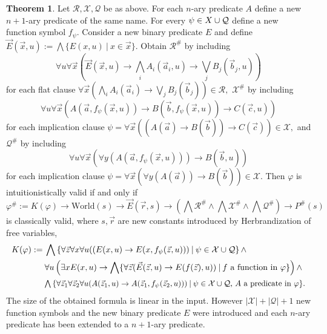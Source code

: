\documentclass{easychair}
\theoremstyle{definition}
\newtheorem{theorem}{Theorem}[section]
\theoremstyle{definition}
\theoremstyle{definition}
\theoremstyle{definition}
\theoremstyle{definition}
\theoremstyle{definition}
\theoremstyle{definition}
\begin{document}
\begin{theorem}\label{thm:fo-translation}
	Let $\mathcal R,\mathcal X,\mathcal Q$ be as above. For each $n$-ary predicate $A$ define a new $n+1$-ary predicate of the same name. For every $\psi\in\mathcal \mathcal X\cup\mathcal Q$ define a new function symbol $f_\psi$. Consider a new binary predicate $E$ and define $\vec E(\vec x, u) := \bigwedge\{E(x, u)\:|\:x\in\vec x\}$. Obtain $\mathcal R^\#$ by including
	$$
		\forall u\forall \vec x\left(\vec E(\vec x, u)\to\bigwedge_i A_i(\vec a_i, u)\to\bigvee_j B_j(\vec b_j, u)\right)
	$$
 	for each flat clause
 	$
 		\forall \vec x\left(\bigwedge_i A_i(\vec a_i)\to\bigvee_j B_j(\vec b_j)\right)\in\mathcal R,
 	$
 	$\mathcal X^\#$ by including
 	$$
 		\forall u\forall \vec x\left(A(\vec a, f_\psi(\vec x, u))\to B(\vec b, f_\psi(\vec x, u))\to C(\vec c, u)\right)
 	$$
 	for each implication clause
	$
		\psi = \forall \vec x\left(\left(A(\vec a)\to B(\vec b)\right)\to C(\vec c)\right)\in\mathcal X,
	$
	and $\mathcal Q^\#$ by including
	$$
		\forall u\forall \vec x\left(\forall y\left(A(\vec a, f_\psi(\vec x, u))\right)\to B(\vec b, u)\right)
	$$
	for each implication clause
	$
		\psi = \forall \vec x\left(\forall y\left(A(\vec a)\right)\to B(\vec b)\right)\in\mathcal X.
	$
	Then $\varphi$ is intuitionistically valid if and only if
	$$
		\varphi^\# := K(\varphi)\to\text{World}(s)\to\vec E(\vec r, s) \to \left(\bigwedge\mathcal R^\#\wedge\bigwedge\mathcal X^\#\wedge\bigwedge\mathcal Q^\#\right)\to P^\#(s)
	$$
	is classically valid, where $s, \vec r$ are new constants introduced by Herbrandization of free variables,
	\begin{align*}
		K(\varphi) := &\:\bigwedge\left\{\forall\vec z\forall x\forall u((E(x, u)\to E(x, f_\psi(\vec z, u)))\:|\:\psi\in\mathcal X\cup\mathcal Q\right\}\wedge\\
		&\:\forall u\left(\exists xE(x, u)\to \bigwedge\{\forall\vec z(\vec E(\vec z, u)\to E(f(\vec z), u))\:|\:\text{$f$ a function in $\varphi$}\}\right)\wedge\\
		&\resizebox{.9\hsize}{!}{$\:\bigwedge\left\{\forall\vec z_1\forall \vec z_2\forall u(A(\vec z_1, u)\to A(\vec z_1, f_\psi(\vec z_2, u)))\:|\:\text{$\psi\in\mathcal X\cup\mathcal Q$, $A$ a predicate in $\varphi$}\right\}$.}
	\end{align*}
	The size of the obtained formula is linear in the input. However $|\mathcal X| + |\mathcal Q| + 1$ new function symbols and the new binary predicate $E$ were introduced and each $n$-ary predicate has been extended to a $n+1$-ary predicate.
\end{theorem}
\end{document}
